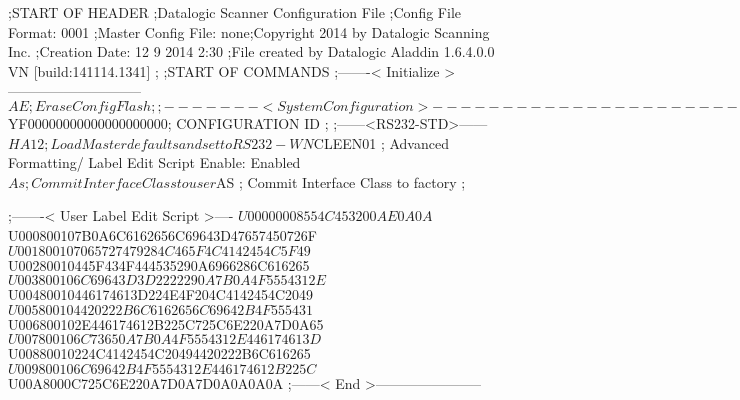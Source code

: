;START OF HEADER
;Datalogic Scanner Configuration File
;Config File Format: 0001
;Master Config File: none;Copyright 2014 by Datalogic Scanning Inc.
;Creation Date: 12 9 2014 2:30
;File created by Datalogic Aladdin 1.6.4.0.0 VN [build:141114.1341]
;
;START OF COMMANDS
;-------< Initialize >-----------------------------
$AE                 ; Erase Config Flash
;
;-------< System Configuration >-------------------------------
$YF00000000000000000000; CONFIGURATION ID
;
;------<RS232-STD>------
$HA12               ; Load Master defaults and set to RS232-WN
$CLEEN01            ; Advanced Formatting/ Label Edit Script Enable: Enabled
$As                 ; Commit Interface Class to user
$AS                 ; Commit Interface Class to factory
;

;-------< User Label Edit Script >----
$U00000008554C453200AE0A0A
$U000800107B0A6C6162656C69643D47657450726F
$U001800107065727479284C465F4C4142454C5F49
$U00280010445F434F444535290A6966286C616265
$U003800106C69643D3D2222290A7B0A4F5554312E
$U00480010446174613D224E4F204C4142454C2049
$U005800104420222B6C6162656C69642B4F555431
$U006800102E446174612B225C725C6E220A7D0A65
$U007800106C73650A7B0A4F5554312E446174613D
$U00880010224C4142454C20494420222B6C616265
$U009800106C69642B4F5554312E446174612B225C
$U00A8000C725C6E220A7D0A7D0A0A0A0A
;------< End >-----------------------
